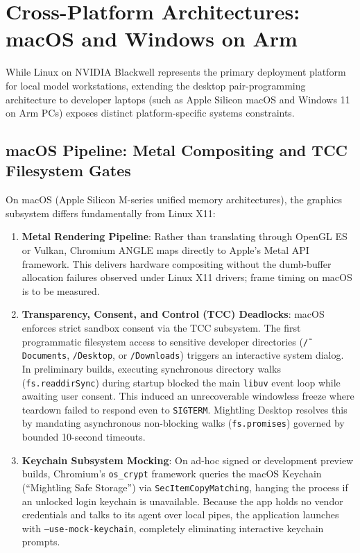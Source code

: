 \documentclass[11pt]{article}
\newcommand{\code}[1]{\texttt{#1}}
\begin{document}
\section{Cross-Platform Architectures: macOS and Windows on Arm}
\label{sec:cross-platform}

While Linux on NVIDIA Blackwell represents the primary deployment platform for local model workstations,
extending the desktop pair-programming architecture to developer laptops (such as Apple Silicon macOS and Windows 11
on Arm PCs) exposes distinct platform-specific systems constraints.

\subsection{macOS Pipeline: Metal Compositing and TCC Filesystem Gates}

On macOS (Apple Silicon M-series unified memory architectures), the graphics subsystem differs fundamentally from Linux X11:
\begin{enumerate}
    \item \textbf{Metal Rendering Pipeline}: Rather than translating through OpenGL ES or Vulkan, Chromium ANGLE maps directly
    to Apple's Metal API framework. This delivers hardware compositing without the dumb-buffer allocation failures observed under
    Linux X11 drivers; frame timing on macOS is to be measured.
    \item \textbf{Transparency, Consent, and Control (TCC) Deadlocks}: macOS enforces strict sandbox consent via the TCC subsystem.
    The first programmatic filesystem access to sensitive developer directories (\code{\~/Documents}, \code{\~/Desktop}, or \code{\~/Downloads})
    triggers an interactive system dialog. In preliminary builds, executing synchronous directory walks (\code{fs.readdirSync}) during
    startup blocked the main \code{libuv} event loop while awaiting user consent. This induced an unrecoverable windowless freeze where
    teardown failed to respond even to \code{SIGTERM}. Mightling Desktop resolves this by mandating asynchronous non-blocking walks
    (\code{fs.promises}) governed by bounded 10-second timeouts.
    \item \textbf{Keychain Subsystem Mocking}: On ad-hoc signed or development preview builds, Chromium's \code{os\_crypt} framework
    queries the macOS Keychain (``Mightling Safe Storage'') via \code{SecItemCopyMatching}, hanging the process if an unlocked login
    keychain is unavailable. Because the app holds no vendor credentials and talks to its agent over local pipes, the application
    launches with \code{--use-mock-keychain}, completely eliminating interactive keychain prompts.
\end{enumerate}
\end{document}

